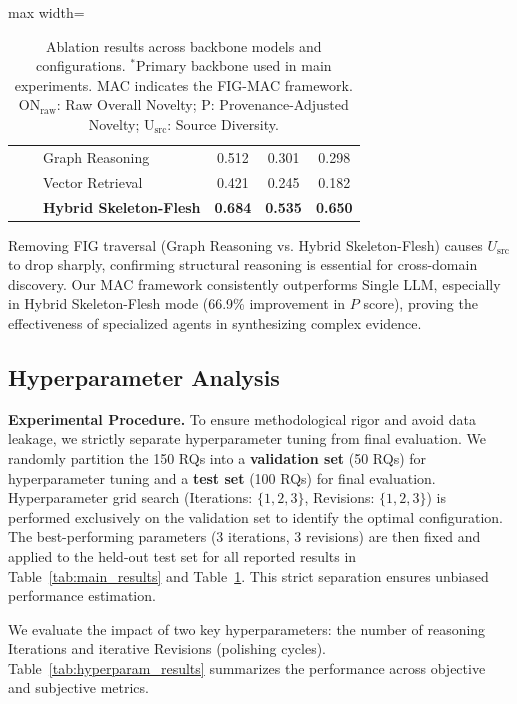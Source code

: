\documentclass[runningheads]{llncs}
\begin{document}
\begin{table}[t]
\begin{adjustbox}{max width=\textwidth}
\begin{tabular}{lllccc}
 &  & Graph Reasoning & 0.512 & 0.301 & 0.298 \\
 &  & Vector Retrieval & 0.421 & 0.245 & 0.182 \\
 &  & \textbf{Hybrid Skeleton-Flesh} & \textbf{0.684} & \textbf{0.535} & \textbf{0.650} \\
\bottomrule
\end{tabular}
\end{adjustbox}
\caption{Ablation results across backbone models and configurations. $^*$Primary backbone used in main experiments. MAC indicates the FIG-MAC framework. ON$_{\text{raw}}$: Raw Overall Novelty; P: Provenance-Adjusted Novelty; U$_{\text{src}}$: Source Diversity.}
\label{tab:ablation_results}
\end{table}

Removing FIG traversal (Graph Reasoning vs. Hybrid Skeleton-Flesh) causes $U_{\text{src}}$ to drop sharply, confirming structural reasoning is essential for cross-domain discovery. Our MAC framework consistently outperforms Single LLM, especially in Hybrid Skeleton-Flesh mode (66.9\% improvement in $P$ score), proving the effectiveness of specialized agents in synthesizing complex evidence.
\subsection{Hyperparameter Analysis}
\label{sec:hyperparams}

\textbf{Experimental Procedure.} To ensure methodological rigor and avoid data leakage, we strictly separate hyperparameter tuning from final evaluation. We randomly partition the 150 RQs into a \textbf{validation set} (50 RQs) for hyperparameter tuning and a \textbf{test set} (100 RQs) for final evaluation. Hyperparameter grid search (Iterations: $\{1,2,3\}$, Revisions: $\{1,2,3\}$) is performed exclusively on the validation set to identify the optimal configuration. The best-performing parameters (3 iterations, 3 revisions) are then fixed and applied to the held-out test set for all reported results in Table~\ref{tab:main_results} and Table~\ref{tab:ablation_results}. This strict separation ensures unbiased performance estimation.

We evaluate the impact of two key hyperparameters: the number of reasoning Iterations and iterative Revisions (polishing cycles). Table~\ref{tab:hyperparam_results} summarizes the performance across objective and subjective metrics.
\end{document}
